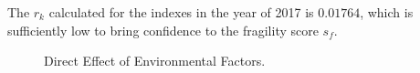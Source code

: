 The $r_k$ calculated for the indexes in the year of 2017 is $0.01764$, which is sufficiently low to bring confidence to the fragility score $s_f$.

\begin{figure}[htbp]
    \centering
    \caption{Direct Effect of Environmental Factors.}
    \label{tab:exp:direct}
\end{figure}

